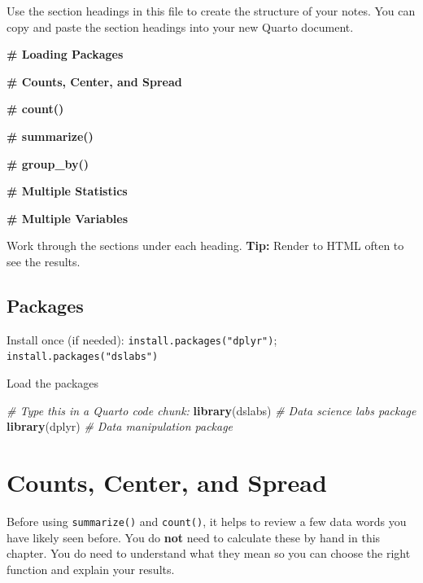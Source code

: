 \documentclass[
]{article}
\newenvironment{Shaded}{\begin{snugshade}}{\end{snugshade}}
\newcommand{\CommentTok}[1]{\textcolor[rgb]{0.56,0.35,0.01}{\textit{#1}}}
\newcommand{\FunctionTok}[1]{\textcolor[rgb]{0.13,0.29,0.53}{\textbf{#1}}}
\newcommand{\NormalTok}[1]{#1}
\begin{document}
Use the section headings in this file to create the structure of your
notes. You can copy and paste the section headings into your new Quarto
document.

\begin{Shaded}
\begin{Highlighting}[]

\FunctionTok{\# Loading Packages}

\FunctionTok{\# Counts, Center, and Spread}

\FunctionTok{\# count()}

\FunctionTok{\# summarize()}

\FunctionTok{\# group\_by()}

\FunctionTok{\# Multiple Statistics}

\FunctionTok{\# Multiple Variables}
\end{Highlighting}
\end{Shaded}

Work through the sections under each heading. \textbf{Tip:} Render to
HTML often to see the results.

\subsection{\texorpdfstring{ Packages}{ Packages}}\label{packages}

Install once (if needed): \texttt{install.packages("dplyr")};
\texttt{install.packages("dslabs")}

Load the packages

\begin{Shaded}
\begin{Highlighting}[]
\CommentTok{\#  Type this in a Quarto code chunk:}
\FunctionTok{library}\NormalTok{(dslabs)  }\CommentTok{\# Data science labs package}
\FunctionTok{library}\NormalTok{(dplyr)   }\CommentTok{\# Data manipulation package}
\end{Highlighting}
\end{Shaded}

\section{\texorpdfstring{ Counts, Center, and
Spread}{ Counts, Center, and Spread}}\label{counts-center-and-spread}

Before using \texttt{summarize()} and \texttt{count()}, it helps to
review a few data words you have likely seen before. You do \textbf{not}
need to calculate these by hand in this chapter. You do need to
understand what they mean so you can choose the right function and
explain your results.
\end{document}
